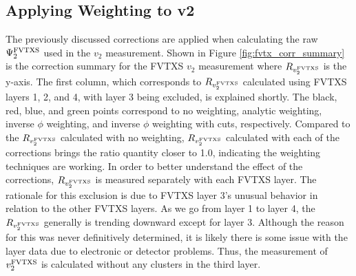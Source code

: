 \subsection{Applying Weighting to v2}
The previously discussed corrections are applied when calculating the raw $\Psi_2^{\rm FVTXS}$ used in the $v_2$ measurement. Shown in Figure \ref{fig:fvtx_corr_summary} is the correction summary for the FVTXS $v_2$ measurement where $R_{v_2^{\rm FVTXS}}$ is the y-axis. The first column, which corresponds to $R_{v_2^{\rm FVTXS}}$ calculated using FVTXS layers 1, 2, and 4, with layer 3 being excluded, is explained shortly. The black, red, blue, and green points correspond to no weighting, analytic weighting, inverse $\phi$ weighting, and inverse $\phi$ weighting with cuts, respectively. Compared to the $R_{v_2^{\rm FVTXS}}$ calculated with no weighting, $R_{v_2^{\rm FVTXS}}$ calculated with each of the corrections brings the ratio quantity closer to 1.0, indicating the weighting techniques are working.  In order to better understand the effect of the corrections, $R_{v_2^{\rm FVTXS}}$ is measured separately with each FVTXS layer. The rationale for this exclusion is due to FVTXS layer 3's unusual behavior in relation to the other FVTXS layers. As we go from layer 1 to layer 4, the $R_{v_2^{\rm FVTXS}}$ generally is trending downward except for layer 3. Although the reason for this was never definitively determined, it is likely there is some issue with the layer data due to electronic or detector problems. Thus, the measurement of $v_2^{\rm FVTXS}$ is calculated without any clusters in the third layer.

